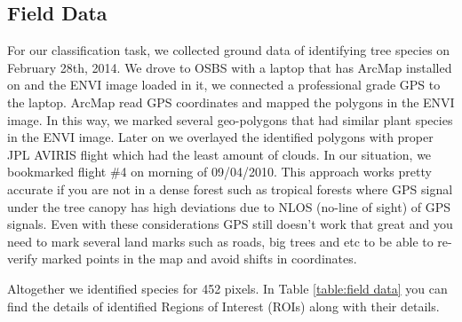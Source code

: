 \documentclass[remotesensing,article,accept,moreauthors,pdftex,12pt,a4paper]{mdpi}
\begin{document}
\subsection{Field Data}


For our classification task, we collected ground data of identifying tree species on February 28th, 2014. We drove to OSBS with a laptop that has ArcMap installed on and the ENVI image loaded in it, we connected a professional grade GPS to the laptop. ArcMap read GPS coordinates and mapped the polygons in the ENVI image. In this way, we marked several geo-polygons that had similar plant species in the ENVI image. Later on we overlayed the identified polygons with proper JPL AVIRIS flight which had the least amount of clouds. In our situation, we bookmarked flight \#4 on morning of 09/04/2010. This approach works pretty accurate if you are not in a dense forest such as tropical forests where GPS signal under the tree canopy has high deviations due to NLOS (no-line of sight) of GPS signals. Even with these considerations GPS still doesn't work that great and you need to mark several land marks such as roads, big trees and etc to be able to re-verify marked points in the map and avoid shifts in coordinates.

Altogether we identified species for 452 pixels. In Table \ref{table:field data} you can find the details of identified Regions of Interest (ROIs) along with their details. 







\end{document}
